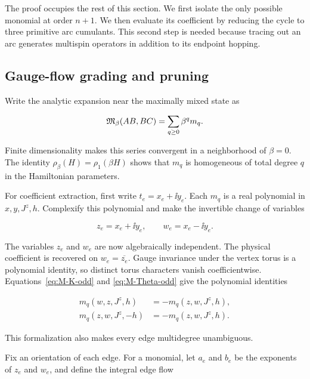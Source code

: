 The proof occupies the rest of this section.  We first isolate the only
possible monomial at order $n+1$.  We then evaluate its coefficient by
reducing the cycle to three primitive arc cumulants.  This second step is
needed because tracing out an arc generates multispin operators in addition
to its endpoint hopping.

\subsection{Gauge-flow grading and pruning}

Write the analytic expansion near the maximally mixed state as

\begin{equation}
 \mathfrak{M}_\beta(AB,BC)=\sum_{q\geq0}\beta^q m_q.
 \label{eq:unicyclic-series}
\end{equation}

Finite dimensionality makes this series convergent in a neighborhood of
$\beta=0$.  The identity $\rho_\beta(H)=\rho_1(\beta H)$ shows that $m_q$ is
homogeneous of total degree $q$ in the Hamiltonian parameters.

For coefficient extraction, first write $t_e=x_e+\ii y_e$.  Each $m_q$ is a
real polynomial in $x,y,J^z,h$.  Complexify this polynomial and make the
invertible change of variables

\begin{equation}
 z_e=x_e+\ii y_e,
 \qquad
 w_e=x_e-\ii y_e.
 \label{eq:formal-complexification}
\end{equation}

The variables $z_e$ and $w_e$ are now algebraically independent.  The
physical coefficient is recovered on $w_e=\overline{z_e}$.  Gauge invariance
under the vertex torus is a polynomial identity, so distinct torus characters
vanish coefficientwise.  Equations~\eqref{eq:M-K-odd} and
\eqref{eq:M-Theta-odd} give the polynomial identities

\begin{align}
 m_q(w,z,J^z,h)&=-m_q(z,w,J^z,h),
 \label{eq:formal-K-oddness}\\
 m_q(z,w,J^z,-h)&=-m_q(z,w,J^z,h).
 \label{eq:formal-Theta-oddness}
\end{align}

This formalization also makes every edge multidegree unambiguous.

Fix an orientation of each edge.  For a monomial, let $a_e$ and $b_e$ be the
exponents of $z_e$ and $w_e$, and define the integral edge flow

